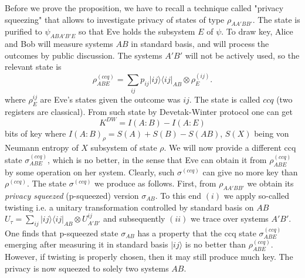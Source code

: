 \documentclass[twocolumn,prl,aps]{revtex4}
\def\be{\begin{equation}}
\def\ee{\end{equation}}
\def\>{\rangle}
\def\<{\langle}
\def\ot{\otimes}
\def\rhoccq{\rho^{(ccq)}}
\def\rhoccqabe{\rho^{(ccq)}_{ABE}}
\def\rhoaabb{\rho_{AA'BB'}}
\def\sigmaccqabe{\sigma^{(ccq)}_{ABE}}
\def\sigmaccq{\sigma^{(ccq)}}
\def\sigmaab{\sigma_{AB}}
\begin{document}
Before we prove the proposition, we have to recall a technique called "privacy squeezing" 
\cite{keyhuge} that allows to investigate privacy of states of type $\rho_{AA'BB'}$.
The state is purified to $\psi_{ABA'B'E}$ so that Eve holds the subsystem $E$ of 
$\psi$. To draw key, Alice and Bob will measure systems $AB$ in standard basis,
and will process the outcomes by public discussion. The systems $A'B'$ 
will not be actively used, so the relevant state is 
\be
\rho_{ABE}^{(ccq)} = \sum_{ij} p_{ij} |ij\>\<ij|_{AB} \ot \rho^{(ij)}_E.
\ee
where $\rho^{ij}_E$ are Eve's states given the outcome was $ij$. The state is called $ccq$
(two registers are classical).
From such state by Devetak-Winter \cite{DevetakWinter-hash} protocol one can get 
\be
K^{DW}=I(A:B)-I(A:E)
\label{eq:dwrate}
\ee
bits of key where $I(A:B)_{\rho} = S(A) + S(B) - S(AB)$, $S(X)$ being von Neumann 
entropy of $X$ subsystem of state $\rho$. We will now provide a different 
ccq state $\sigmaccqabe$, which is 
no better, in the sense that Eve can obtain it from $ \rhoccqabe$ 
by some operation on her system. Clearly, such $\sigmaccq$  can give no more key than 
$\rhoccq$. The state $\sigmaccq$ we produce as follows. First, from $\rhoaabb$ 
we obtain its {\it privacy squeezed} (p-squeezed) version $\sigmaab$. To this end  $(i)$ we apply so-called twisting 
\cite{pptkey,keyhuge}  i.e. a unitary  transformation controlled by standard basis on $AB$ 
$U_\tau=\sum_{ij} |ij\>\<ij|_{AB}\ot U^{ij}_{A'B'}$  and subsequently
$(ii)$ we trace over systems $A'B'$. One finds \cite{pptkey,keyhuge}
that  p-squeezed state $\sigmaab$ has a property that 
the ccq state $\sigmaccqabe$ emerging after measuring it in standard basis $|ij\>$ 
is no better than $\rhoccqabe$. However, if twisting is properly chosen,
then it may still produce much key. The privacy is now squeezed to solely two systems 
$AB$. 
\end{document}
